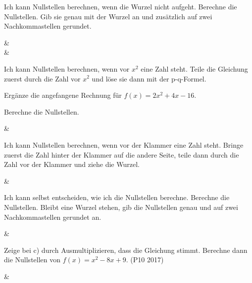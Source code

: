 \begin{aufgabe}{Ich kann Nullstellen berechnen, wenn die Wurzel nicht aufgeht. Berechne die Nullstellen. Gib sie genau mit der Wurzel an und zusätzlich auf zwei Nachkommastellen gerundet.}
\begin{gleichungsraster}[4]
 &  \\[7mm]
 & \\
\end{gleichungsraster}
\end{aufgabe}

\begin{aufgabe}{Ich kann Nullstellen berechnen, wenn vor $x^2$ eine Zahl steht. Teile die Gleichung zuerst durch die Zahl vor $x^2$ und löse sie dann mit der p-q-Formel.}
\begin{teile}
\teil Ergänze die angefangene Rechnung für $f(x) = 2x^2 + 4x - 16$.
\end{teile}
\medskip
Berechne die Nullstellen.
\begin{gleichungsraster}[5]
 &  \\
\end{gleichungsraster}
\end{aufgabe}

\begin{aufgabe}{Ich kann Nullstellen berechnen, wenn vor der Klammer eine Zahl steht. Bringe zuerst die Zahl hinter der Klammer auf die andere Seite, teile dann durch die Zahl vor der Klammer und ziehe die Wurzel.}
\begin{gleichungsraster}[5]
 &  \\
\end{gleichungsraster}
\end{aufgabe}

\begin{aufgabe}{Ich kann selbst entscheiden, wie ich die Nullstellen berechne. Berechne die Nullstellen. Bleibt eine Wurzel stehen, gib die Nullstellen genau und auf zwei Nachkommastellen gerundet an.}
\begin{gleichungsraster}[5]
 &  \\
\end{gleichungsraster}
\vspace{7mm}
Zeige bei c) durch Ausmultiplizieren, dass die Gleichung stimmt. Berechne dann die Nullstellen von $f(x) = x^2 - 8x + 9$. (P10 2017)
\begin{gleichungsraster}[6]
 & \\
\end{gleichungsraster}
\end{aufgabe}

